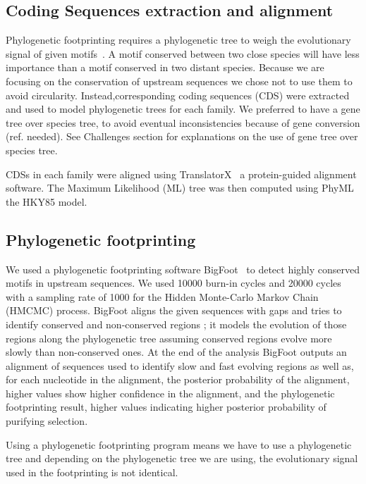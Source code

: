 \subsection*{Coding Sequences extraction and alignment}

Phylogenetic footprinting requires a phylogenetic tree to weigh the evolutionary signal of given motifs~\citep{zhang_mice_2003}. A motif conserved between two close species will have less importance than a motif conserved in two distant species. Because we are focusing on the conservation of upstream sequences we chose not to use them to avoid circularity. Instead,corresponding coding sequences (CDS) were extracted and used to model phylogenetic trees for each family. We preferred to have a gene tree over species tree, to avoid eventual inconsistencies because of gene conversion (ref. needed). See Challenges section for explanations on the use of gene tree over species tree.

CDSs in each family were aligned using TranslatorX~\citep{abascal_translatorx:_2010} a protein-guided alignment software. The Maximum Likelihood (ML) tree was then computed using PhyML~\citep{guindon_new_2010} the HKY85 model.

\subsection*{Phylogenetic footprinting}

We used a phylogenetic footprinting software BigFoot~\citep{satija_bigfoot:_2009} to detect highly conserved motifs in upstream sequences. We used 10000 burn-in cycles and 20000 cycles with a sampling rate of 1000 for the Hidden Monte-Carlo Markov Chain (HMCMC) process. BigFoot aligns the given sequences with gaps and tries to identify conserved and non-conserved regions ; it models the evolution of those regions along the phylogenetic tree assuming conserved regions evolve more slowly than non-conserved ones. At the end of the analysis BigFoot outputs an alignment of sequences used to identify slow and fast evolving regions as well as, for each nucleotide in the alignment, the posterior probability of the alignment, higher values show higher confidence in the alignment, and the phylogenetic footprinting result, higher values indicating higher posterior probability of purifying selection.

Using a phylogenetic footprinting program means we have to use a phylogenetic tree and depending on the phylogenetic tree we are using, the evolutionary signal used in the footprinting is not identical.

